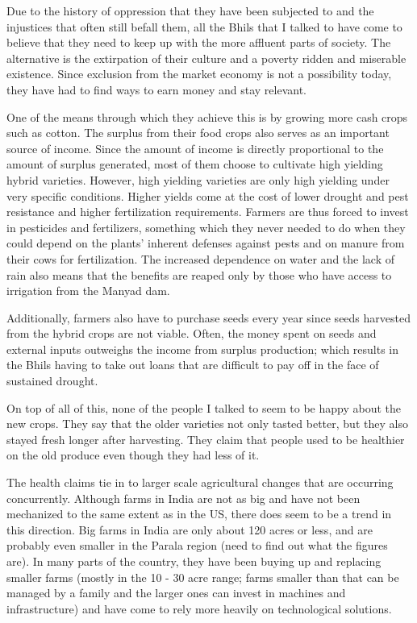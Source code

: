 \documentclass[report.tex]{subfiles}
\begin{document}
Due to the history of oppression that they have been subjected to and the injustices that often still befall them, all the Bhils that I talked to have come to believe that they need to keep up with the more affluent parts of society. The alternative is the extirpation of their culture and a poverty ridden and miserable existence. Since exclusion from the market economy is not a possibility today, they have had to find ways to earn money and stay relevant.

One of the means through which they achieve this is by growing more cash crops such as cotton. The surplus from their food crops also serves as an important source of income. Since the amount of income is directly proportional to the amount of surplus generated, most of them choose to cultivate high yielding hybrid varieties. However, high yielding varieties are only high yielding under very specific conditions. Higher yields come at the cost of lower drought and pest resistance and higher fertilization requirements. Farmers are thus forced to invest in pesticides and fertilizers, something which they never needed to do when they could depend on the plants' inherent defenses against pests and on manure from their cows for fertilization. The increased dependence on water and the lack of rain also means that the benefits are reaped only by those who have access to irrigation from the Manyad dam.

Additionally, farmers also have to purchase seeds every year since seeds harvested from the hybrid crops are not viable. Often, the money spent on seeds and external inputs outweighs the income from surplus production; which results in the Bhils having to take out loans that are difficult to pay off in the face of sustained drought.

On top of all of this, none of the people I talked to seem to be happy about the new crops. They say that the older varieties not only tasted better, but they also stayed fresh longer after harvesting. They claim that people used to be healthier on the old produce even though they had less of it.

The health claims tie in to larger scale agricultural changes that are occurring concurrently. Although farms in India are not as big and have not been mechanized to the same extent as in the US, there does seem to be a trend in this direction. Big farms in India are only about 120 acres or less, and are probably even smaller in the Parala region (need to find out what the figures are). In many parts of the country, they have been buying up and replacing smaller farms (mostly in the 10 - 30 acre range; farms smaller than that can be managed by a family and the larger ones can invest in machines and infrastructure) and have come to rely more heavily on technological solutions.
\end{document}
